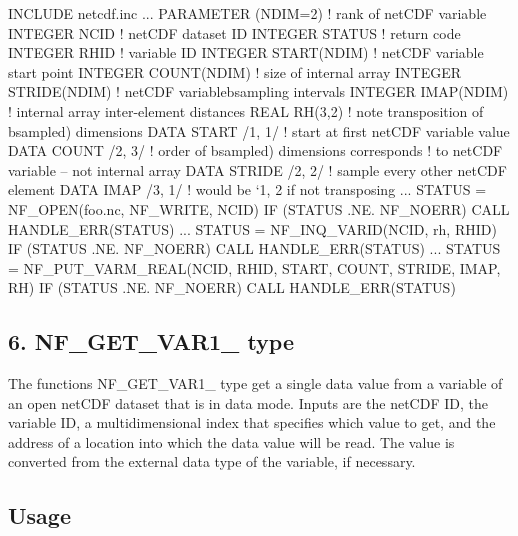 I\+N\+C\+L\+U\+DE \textquotesingle{}netcdf.\+inc\textquotesingle{} ... P\+A\+R\+A\+M\+E\+T\+ER (N\+D\+IM=2) ! rank of net\+C\+DF variable I\+N\+T\+E\+G\+ER N\+C\+ID ! net\+C\+DF dataset ID I\+N\+T\+E\+G\+ER S\+T\+A\+T\+US ! return code I\+N\+T\+E\+G\+ER R\+H\+ID ! variable ID I\+N\+T\+E\+G\+ER S\+T\+A\+R\+T(\+N\+D\+I\+M) ! net\+C\+DF variable start point I\+N\+T\+E\+G\+ER C\+O\+U\+N\+T(\+N\+D\+I\+M) ! size of internal array I\+N\+T\+E\+G\+ER S\+T\+R\+I\+D\+E(\+N\+D\+I\+M) ! net\+C\+DF variablebsampling intervals I\+N\+T\+E\+G\+ER I\+M\+A\+P(\+N\+D\+I\+M) ! internal array inter-\/element distances R\+E\+AL R\+H(3,2) ! note transposition of bsampled) dimensions D\+A\+TA S\+T\+A\+RT /1, 1/ ! start at first net\+C\+DF variable value D\+A\+TA C\+O\+U\+NT /2, 3/ ! order of bsampled) dimensions corresponds ! to net\+C\+DF variable -- not internal array D\+A\+TA S\+T\+R\+I\+DE /2, 2/ ! sample every other net\+C\+DF element D\+A\+TA I\+M\+AP /3, 1/ ! would be `1, 2\textquotesingle{} if not transposing ... S\+T\+A\+T\+US = N\+F\+\_\+\+O\+P\+EN(\textquotesingle{}foo.\+nc\textquotesingle{}, N\+F\+\_\+\+W\+R\+I\+TE, N\+C\+ID) IF (S\+T\+A\+T\+US .NE. N\+F\+\_\+\+N\+O\+E\+RR) C\+A\+LL H\+A\+N\+D\+L\+E\+\_\+\+E\+R\+R(\+S\+T\+A\+T\+U\+S) ... S\+T\+A\+T\+US = N\+F\+\_\+\+I\+N\+Q\+\_\+\+V\+A\+R\+ID(N\+C\+ID, \textquotesingle{}rh\textquotesingle{}, R\+H\+ID) IF (S\+T\+A\+T\+US .NE. N\+F\+\_\+\+N\+O\+E\+RR) C\+A\+LL H\+A\+N\+D\+L\+E\+\_\+\+E\+R\+R(\+S\+T\+A\+T\+U\+S) ... S\+T\+A\+T\+US = N\+F\+\_\+\+P\+U\+T\+\_\+\+V\+A\+R\+M\+\_\+\+R\+E\+A\+L(\+N\+C\+I\+D, R\+H\+I\+D, S\+T\+A\+R\+T, C\+O\+U\+N\+T, S\+T\+R\+I\+D\+E, I\+M\+A\+P, R\+H) IF (S\+T\+A\+T\+US .NE. N\+F\+\_\+\+N\+O\+E\+RR) C\+A\+LL H\+A\+N\+D\+L\+E\+\_\+\+E\+R\+R(\+S\+T\+A\+T\+U\+S)

\subsection*{6. N\+F\+\_\+\+G\+E\+T\+\_\+\+V\+A\+R1\+\_\+ type }

The functions N\+F\+\_\+\+G\+E\+T\+\_\+\+V\+A\+R1\+\_\+ type get a single data value from a variable of an open net\+C\+DF dataset that is in data mode. Inputs are the net\+C\+DF ID, the variable ID, a multidimensional index that specifies which value to get, and the address of a location into which the data value will be read. The value is converted from the external data type of the variable, if necessary.

\subsection*{Usage }

